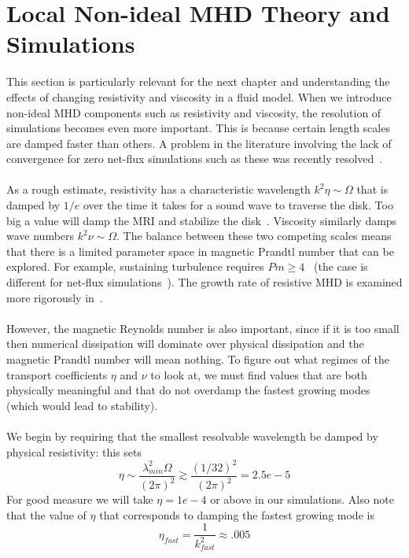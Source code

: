 \section{Local Non-ideal MHD Theory and Simulations} \label{sec:localnonideal}
This section is particularly relevant for the next chapter and understanding the effects of changing resistivity and viscosity in a fluid model. When we introduce non-ideal MHD components such as resistivity and viscosity, the resolution of simulations becomes even more important. This is because certain length scales are damped faster than others. A problem in the literature involving the lack of convergence for zero net-flux simulations such as these was recently resolved~\cite{Fromang2007a,Shi2016}.\\
\\
As a rough estimate, resistivity has a characteristic wavelength $k^2\eta\sim\Omega$ that is damped by $1/e$ over the time it takes for a sound wave to traverse the disk. Too big a value will damp the MRI and stabilize the disk~\cite{Fleming2000}. Viscosity similarly damps wave numbers $k^2\nu\sim\Omega$. The balance between these two competing scales means that there is a limited parameter space in magnetic Prandtl number that can be explored. For example, sustaining turbulence requires $Pm\ge4$~\cite{Fromang2007b,Simon2009a} (the case is different for net-flux simulations~\cite{Simon2009b}). The growth rate of resistive MHD is examined more rigorously in~.\\
\\
However, the magnetic Reynolds number is also important, since if it is too small then numerical dissipation will dominate over physical dissipation and the magnetic Prandtl number will mean nothing. To figure out what regimes of the transport coefficients $\eta$ and $\nu$ to look at, we must find values that are both physically meaningful and that do not overdamp the fastest growing modes (which would lead to stability). \\
\\
We begin by requiring that the smallest resolvable wavelength be damped by physical resistivity: this sets
\begin{equation*}
  \eta\sim\frac{\lambda_{min}^2\Omega}{(2\pi)^2}\gtrsim\frac{(1/32)^2}{(2\pi)^2}=2.5e-5
\end{equation*}
For good measure we will take $\eta=1e-4$ or above in our simulations. Also note that the value of $\eta$ that corresponds to damping the fastest growing mode is
\begin{equation*}
  \eta_{fast}=\frac1{k^2_{fast}}\approx .005
\end{equation*}
